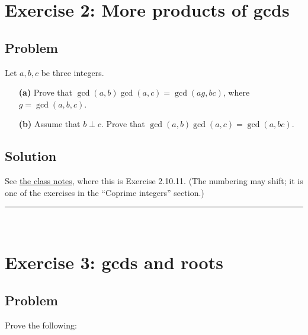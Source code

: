 \documentclass[paper=a4, fontsize=12pt]{scrartcl} %
\newcommand{\tup}[1]{\left( #1 \right)}
\newcommand{\horrule}[1]{\rule{\linewidth}{#1}} %
\theoremstyle{plainsl}
\theoremstyle{definition}
\theoremstyle{remark}
\begin{document}
\section{Exercise 2: More products of gcds}

\subsection{Problem}

Let $a, b, c$ be three integers.

\begin{enumerate}

\item[\textbf{(a)}]
Prove that
$\gcd\tup{a, b} \gcd\tup{a, c}
= \gcd\tup{ag, bc}$,
where $g = \gcd\tup{a, b, c}$.

\item[\textbf{(b)}]
Assume that $b \perp c$.
Prove that
$\gcd\tup{a, b} \gcd\tup{a, c} = \gcd\tup{a, bc}$.

\end{enumerate}

\subsection{Solution}

See
\href{http://www.cip.ifi.lmu.de/~grinberg/t/19s/notes.pdf}{the class notes},
where this is Exercise 2.10.11. (The numbering may shift; it is one of the
exercises in the
``Coprime integers''
section.)

\horrule{0.3pt} \\[0.4cm]

\section{Exercise 3: gcds and roots}

\subsection{Problem}

Prove the following:
\end{document}
